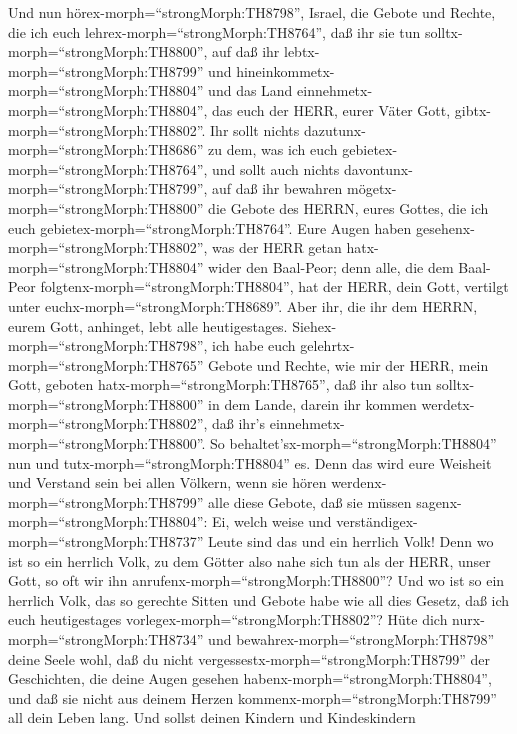  Und nun hörex-morph=``strongMorph:TH8798'', Israel, die
Gebote und Rechte, die ich euch lehrex-morph=``strongMorph:TH8764'', daß
ihr sie tun solltx-morph=``strongMorph:TH8800'', auf daß ihr
lebtx-morph=``strongMorph:TH8799'' und
hineinkommetx-morph=``strongMorph:TH8804'' und das Land
einnehmetx-morph=``strongMorph:TH8804'', das euch der HERR, eurer Väter
Gott, gibtx-morph=``strongMorph:TH8802''.  Ihr sollt nichts
dazutunx-morph=``strongMorph:TH8686'' zu dem, was ich euch
gebietex-morph=``strongMorph:TH8764'', und sollt auch nichts
davontunx-morph=``strongMorph:TH8799'', auf daß ihr bewahren
mögetx-morph=``strongMorph:TH8800'' die Gebote des HERRN, eures Gottes,
die ich euch gebietex-morph=``strongMorph:TH8764''.  Eure
Augen haben gesehenx-morph=``strongMorph:TH8802'', was der HERR getan
hatx-morph=``strongMorph:TH8804'' wider den Baal-Peor; denn alle, die
dem Baal-Peor folgtenx-morph=``strongMorph:TH8804'', hat der HERR, dein
Gott, vertilgt unter euchx-morph=``strongMorph:TH8689''. 
Aber ihr, die ihr dem HERRN, eurem Gott, anhinget, lebt alle
heutigestages.  Siehex-morph=``strongMorph:TH8798'', ich
habe euch gelehrtx-morph=``strongMorph:TH8765'' Gebote und Rechte, wie
mir der HERR, mein Gott, geboten hatx-morph=``strongMorph:TH8765'', daß
ihr also tun solltx-morph=``strongMorph:TH8800'' in dem Lande, darein
ihr kommen werdetx-morph=``strongMorph:TH8802'', daß ihr's
einnehmetx-morph=``strongMorph:TH8800''.  So
behaltet'sx-morph=``strongMorph:TH8804'' nun und
tutx-morph=``strongMorph:TH8804'' es. Denn das wird eure Weisheit und
Verstand sein bei allen Völkern, wenn sie hören
werdenx-morph=``strongMorph:TH8799'' alle diese Gebote, daß sie müssen
sagenx-morph=``strongMorph:TH8804'': Ei, welch weise und
verständigex-morph=``strongMorph:TH8737'' Leute sind das und ein
herrlich Volk!  Denn wo ist so ein herrlich Volk, zu dem
Götter also nahe sich tun als der HERR, unser Gott, so oft wir ihn
anrufenx-morph=``strongMorph:TH8800''?  Und wo ist so ein
herrlich Volk, das so gerechte Sitten und Gebote habe wie all dies
Gesetz, daß ich euch heutigestages
vorlegex-morph=``strongMorph:TH8802''?  Hüte dich
nurx-morph=``strongMorph:TH8734'' und
bewahrex-morph=``strongMorph:TH8798'' deine Seele wohl, daß du nicht
vergessestx-morph=``strongMorph:TH8799'' der Geschichten, die deine
Augen gesehen habenx-morph=``strongMorph:TH8804'', und daß sie nicht aus
deinem Herzen kommenx-morph=``strongMorph:TH8799'' all dein Leben lang.
Und sollst deinen Kindern und Kindeskindern
